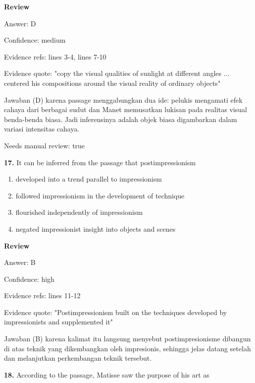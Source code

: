 \documentclass[12pt]{article}
\begin{document}
\par
\begingroup
\setlength{\parskip}{0pt}
\setlength{\parindent}{0pt}
\textbf{Review}\par
Answer: D\par
Confidence: medium\par
Evidence refs: lines 3-4, lines 7-10\par
Evidence quote: "copy the visual qualities of sunlight at different angles ... centered his compositions around the visual reality of ordinary objects"\par
Jawaban (D) karena passage menggabungkan dua ide: pelukis mengamati efek cahaya dari berbagai sudut dan Manet memusatkan lukisan pada realitas visual benda-benda biasa. Jadi inferensinya adalah objek biasa digambarkan dalam variasi intensitas cahaya.\par
Needs manual review: true\par
\endgroup
\par
\vspace{0.25\baselineskip}
\noindent\textbf{17.} It can be inferred from the passage that postimpressionism
\begin{enumerate}[label=(\Alph*),leftmargin=*,itemsep=0.2em]
\item developed into a trend parallel to impressionism
\item followed impressionism in the development of technique
\item flourished independently of impressionism
\item negated impressionist insight into objects and scenes
\end{enumerate}
\par
\begingroup
\setlength{\parskip}{0pt}
\setlength{\parindent}{0pt}
\textbf{Review}\par
Answer: B\par
Confidence: high\par
Evidence refs: lines 11-12\par
Evidence quote: "Postimpressionism built on the techniques developed by impressionists and supplemented it"\par
Jawaban (B) karena kalimat itu langsung menyebut postimpresionisme dibangun di atas teknik yang dikembangkan oleh impresionis, sehingga jelas datang setelah dan melanjutkan perkembangan teknik tersebut.\par
\endgroup
\par
\vspace{0.25\baselineskip}
\noindent\textbf{18.} According to the passage, Matisse saw the purpose of his art as
\end{document}

